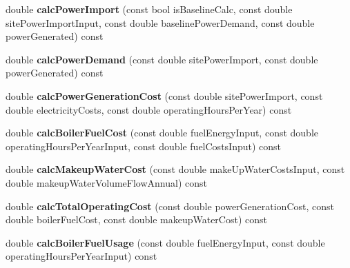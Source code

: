 \begin{DoxyCompactItemize}
\mbox{\label{class_energy_and_cost_calculator_ad96cc7f912704f33786868447da091c3}} 
double {\bfseries calc\+Power\+Import} (const bool is\+Baseline\+Calc, const double site\+Power\+Import\+Input, const double baseline\+Power\+Demand, const double power\+Generated) const
\item 
\mbox{\label{class_energy_and_cost_calculator_a550d20d74d601e4f5e28e70f25565593}} 
double {\bfseries calc\+Power\+Demand} (const double site\+Power\+Import, const double power\+Generated) const
\item 
\mbox{\label{class_energy_and_cost_calculator_a9618725f55b74948cb1eaf8e79ddf1c6}} 
double {\bfseries calc\+Power\+Generation\+Cost} (const double site\+Power\+Import, const double electricity\+Costs, const double operating\+Hours\+Per\+Year) const
\item 
\mbox{\label{class_energy_and_cost_calculator_aa5a5f91e9ed5dab198eda79fc5b18d53}} 
double {\bfseries calc\+Boiler\+Fuel\+Cost} (const double fuel\+Energy\+Input, const double operating\+Hours\+Per\+Year\+Input, const double fuel\+Costs\+Input) const
\item 
\mbox{\label{class_energy_and_cost_calculator_a5d919bd8a35b867cd3c1cd356906c77c}} 
double {\bfseries calc\+Makeup\+Water\+Cost} (const double make\+Up\+Water\+Costs\+Input, const double makeup\+Water\+Volume\+Flow\+Annual) const
\item 
\mbox{\label{class_energy_and_cost_calculator_aa9148a6587edea63d784dba51cbfca9b}} 
double {\bfseries calc\+Total\+Operating\+Cost} (const double power\+Generation\+Cost, const double boiler\+Fuel\+Cost, const double makeup\+Water\+Cost) const
\item 
\mbox{\label{class_energy_and_cost_calculator_a24bf5affb772d9db90af9f95cf737f17}} 
double {\bfseries calc\+Boiler\+Fuel\+Usage} (const double fuel\+Energy\+Input, const double operating\+Hours\+Per\+Year\+Input) const
\item 
\mbox{\label{class_energy_and_cost_calculator_aa301f421bf405bd8a75ac190bb4cad3d}} 

\end{DoxyCompactItemize}
